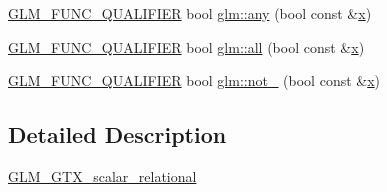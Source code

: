 \begin{DoxyCompactItemize}
\item 
\hyperlink{setup_8hpp_a33fdea6f91c5f834105f7415e2a64407}{G\+L\+M\+\_\+\+F\+U\+N\+C\+\_\+\+Q\+U\+A\+L\+I\+F\+I\+ER} bool \hyperlink{namespaceglm_ad41a7e46efe59ecfa701a0d561b7e8fa}{glm\+::any} (bool const \&\hyperlink{_s_d_l__opengl_8h_ad0e63d0edcdbd3d79554076bf309fd47}{x})
\item 
\hyperlink{setup_8hpp_a33fdea6f91c5f834105f7415e2a64407}{G\+L\+M\+\_\+\+F\+U\+N\+C\+\_\+\+Q\+U\+A\+L\+I\+F\+I\+ER} bool \hyperlink{namespaceglm_a55c4531f4a0de48f87a20702d96d4289}{glm\+::all} (bool const \&\hyperlink{_s_d_l__opengl_8h_ad0e63d0edcdbd3d79554076bf309fd47}{x})
\item 
\hyperlink{setup_8hpp_a33fdea6f91c5f834105f7415e2a64407}{G\+L\+M\+\_\+\+F\+U\+N\+C\+\_\+\+Q\+U\+A\+L\+I\+F\+I\+ER} bool \hyperlink{namespaceglm_a081b70b3c919d22f18bb04e6f9c3b7ca}{glm\+::not\+\_\+} (bool const \&\hyperlink{_s_d_l__opengl_8h_ad0e63d0edcdbd3d79554076bf309fd47}{x})
\end{DoxyCompactItemize}


\subsection{Detailed Description}
\hyperlink{group__gtx__scalar__relational}{G\+L\+M\+\_\+\+G\+T\+X\+\_\+scalar\+\_\+relational} 
